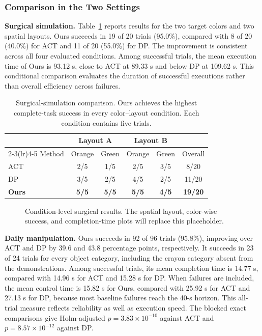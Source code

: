 \subsubsection{Comparison in the Two Settings}
\noindent\textbf{Surgical simulation.}
Table~\ref{tab:surgicalcomparison} reports results for the two target colors and two spatial layouts.
Ours succeeds in 19 of 20 trials (95.0\%), compared with 8 of 20 (40.0\%) for ACT and 11 of 20 (55.0\%) for DP.
The improvement is consistent across all four evaluated conditions.
Among successful trials, the mean execution time of Ours is 93.12 s, close to ACT at 89.33 s and below DP at 109.62 s.
This conditional comparison evaluates the duration of successful executions rather than overall efficiency across failures.

\begin{table}[t]
\centering
\caption{Surgical-simulation comparison. Ours achieves the highest complete-task success in every color--layout condition. Each condition contains five trials.}
\label{tab:surgicalcomparison}
\small
\setlength{\tabcolsep}{3.2pt}
\begin{tabular}{lccccc}
\toprule
& \multicolumn{2}{c}{Layout A} & \multicolumn{2}{c}{Layout B} & \\
\cmidrule(lr){2-3}\cmidrule(lr){4-5}
Method & Orange & Green & Orange & Green & Overall\\
\midrule
ACT & 2/5 & 1/5 & 2/5 & 3/5 & 8/20\\
DP & 3/5 & 2/5 & 4/5 & 2/5 & 11/20\\
\textbf{Ours} & \textbf{5/5} & \textbf{5/5} & \textbf{5/5} & \textbf{4/5} & \textbf{19/20}\\
\bottomrule
\end{tabular}
\end{table}

\begin{figure}[t]
\centering
{}
\caption{Condition-level surgical results. The spatial layout, color-wise success, and completion-time plots will replace this placeholder.}
\label{fig:surgicalconditions}
\end{figure}

\noindent\textbf{Daily manipulation.}
Ours succeeds in 92 of 96 trials (95.8\%), improving over ACT and DP by 39.6 and 43.8 percentage points, respectively.
It succeeds in 23 of 24 trials for every object category, including the crayon category absent from the demonstrations.
Among successful trials, its mean completion time is 14.77 s, compared with 14.96 s for ACT and 15.28 s for DP.
When failures are included, the mean control time is 15.82 s for Ours, compared with 25.92 s for ACT and 27.13 s for DP, because most baseline failures reach the 40-s horizon.
This all-trial measure reflects reliability as well as execution speed.
The blocked exact comparisons give Holm-adjusted $p=3.83\times10^{-10}$ against ACT and $p=8.57\times10^{-12}$ against DP.

